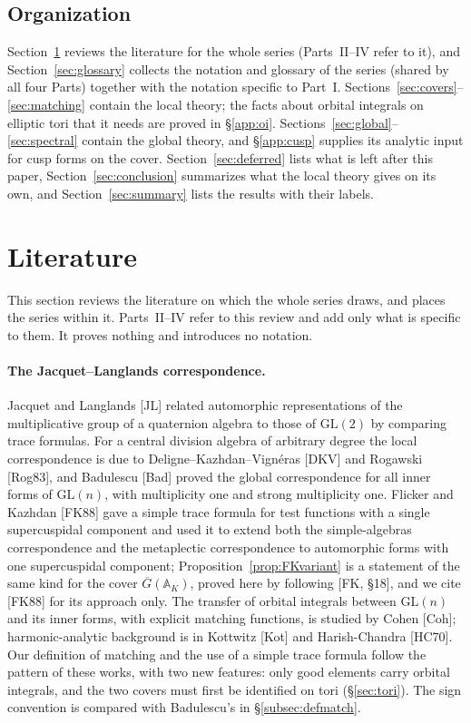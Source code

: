 \documentclass[12pt]{article}
\newcommand{\ov}[1]{\overline{#1}}
\newcommand{\A}{\mathbb{A}}
\newcommand{\GL}{\mathrm{GL}}
\newcommand{\Gb}{\ov{G}}
\theoremstyle{plain}
\theoremstyle{definition}
\begin{document}
\subsection{Organization}
Section~\ref{sec:lit} reviews the literature for the whole series (Parts~II--IV refer to it), and Section~\ref{sec:glossary} collects the notation and glossary of the series (shared by all four Parts) together with the notation specific to Part~I. Sections~\ref{sec:covers}--\ref{sec:matching} contain the local theory; the facts about orbital integrals on elliptic tori that it needs are proved in \S\ref{app:oi}. Sections~\ref{sec:global}--\ref{sec:spectral} contain the global theory, and \S\ref{app:cusp} supplies its analytic input for cusp forms on the cover. Section~\ref{sec:deferred} lists what is left after this paper, Section~\ref{sec:conclusion} summarizes what the local theory gives on its own, and Section~\ref{sec:summary} lists the results with their labels.


\section{Literature}\label{sec:lit}
This section reviews the literature on which the whole series draws, and places the series within it. Parts~II--IV refer to this review and add only what is specific to them. It proves nothing and introduces no notation.

\paragraph{The Jacquet--Langlands correspondence.} Jacquet and Langlands [JL] related automorphic representations of the multiplicative group of a quaternion algebra to those of $\GL(2)$ by comparing trace formulas. For a central division algebra of arbitrary degree the local correspondence is due to Deligne--Kazhdan--Vign\'eras [DKV] and Rogawski [Rog83], and Badulescu [Bad] proved the global correspondence for all inner forms of $\GL(n)$, with multiplicity one and strong multiplicity one. Flicker and Kazhdan [FK88] gave a simple trace formula for test functions with a single supercuspidal component and used it to extend both the simple-algebras correspondence and the metaplectic correspondence to automorphic forms with one supercuspidal component; Proposition~\ref{prop:FKvariant} is a statement of the same kind for the cover $\Gb(\A_K)$, proved here by following [FK, \S18], and we cite [FK88] for its approach only. The transfer of orbital integrals between $\GL(n)$ and its inner forms, with explicit matching functions, is studied by Cohen [Coh]; harmonic-analytic background is in Kottwitz [Kot] and Harish-Chandra [HC70]. Our definition of matching and the use of a simple trace formula follow the pattern of these works, with two new features: only good elements carry orbital integrals, and the two covers must first be identified on tori (\S\ref{sec:tori}). The sign convention is compared with Badulescu's in \S\ref{subsec:defmatch}.
\end{document}
